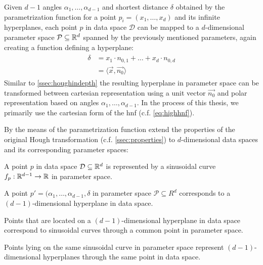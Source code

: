 Given $d-1$ angles $\alpha_1,\dotsc,\alpha_{d-1}$ and shortest distance $\delta$ obtained by the parametrization function for a point $p_i = (x_1,\dotsc,x_d)$ and its infinite hyperplanes, each point $p$ in data space $\mathcal{D}$ can be mapped to a $d$-dimensional parameter space $\mathcal{P} \subseteq \mathbb{R}^d$ spanned by the previously mentioned parameters, again creating a function defining a hyperplane:
\begin{align}
    \begin{split}
        \delta &= x_1 \cdot n_{0,1} + \dots + x_d \cdot n_{0,d}\\
        &= \langle \vec{x},\vec{n_0} \rangle\label{eq:highhnf}
    \end{split}
\end{align}
Similar to \autoref{ssec:houghindepth} the resulting hyperplane in parameter space can be transformed between  cartesian representation using a unit vector $\vec{n_0}$ and polar representation based on angles $\alpha_1,\dotsc,\alpha_{d-1}$. In the process of this thesis, we primarily use the cartesian form of the \gls{hnf} (c.f. \autoref{eq:highhnf}).


By the means of the parametrization function \textcite{CASHachtert2008robust} extend the properties of the original Hough transformation (c.f. \autoref{ssec:properties}) to $d$-dimensional data spaces and its corresponding parameter spaces: 
\begin{quoting}
\begin{property}
A point $p$ in data space $\mathcal{D} \subseteq \mathbb{R}^d$ is represented by a sinusoidal curve $f_p:\mathbb{R}^{d-1}\rightarrow\mathbb{R}$ in parameter space.
\end{property}
\begin{property}
A point $p' = (\alpha_1,\dotsc,\alpha_{d-1},\delta$ in parameter space $\mathcal{P} \subseteq R^d$ corresponds to a $(d-1)$-dimensional hyperplane in data space.
\end{property}
\begin{property}
Points that are located on a $(d-1)$-dimensional hyperplane in data space correspond to sinusoidal curves through a common point in parameter space.
\end{property}
\begin{property}
Points lying on the same sinusoidal curve in parameter space represent $(d-1)$-dimensional hyperplanes through the same point in data space.
\end{property}
\end{quoting}

